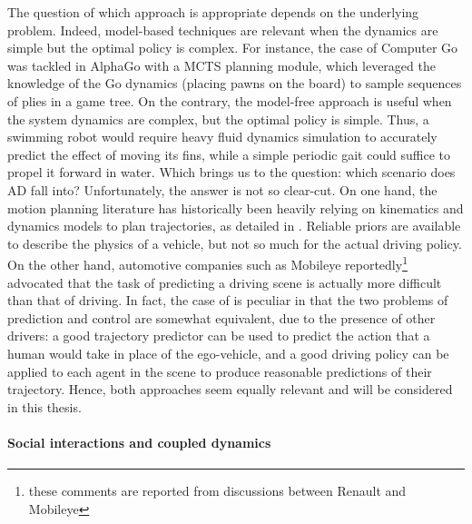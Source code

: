 The question of which approach is appropriate depends on the underlying problem. Indeed, model-based techniques are relevant when the dynamics are simple but the optimal policy is complex. For instance, the case of Computer Go was tackled in AlphaGo \citep{Silver2016,Silver2017,Silver2018} with a \gls{MCTS} planning module, which leveraged the knowledge of the Go dynamics (placing pawns on the board) to sample sequences of plies in a game tree. On the contrary, the model-free approach is useful when the system dynamics are complex, but the optimal policy is simple. Thus, a swimming robot would require heavy fluid dynamics simulation to accurately predict the effect of moving its fins, while a simple periodic gait could suffice to propel it forward in water. Which brings us to the question: which scenario does \gls{AD} fall into? Unfortunately, the answer is not so clear-cut. On one hand, the motion planning literature has historically been heavily relying on kinematics and dynamics models to plan trajectories, as detailed in . Reliable priors are available to describe the physics of a vehicle, but not so much for the actual driving policy. On the other hand, automotive companies such as Mobileye reportedly\footnote{these comments are reported from discussions between Renault and Mobileye} advocated that the task of predicting a driving scene is actually more difficult than that of driving. In fact, the case of  is peculiar in that the two problems of prediction and control are somewhat equivalent, due to the presence of other drivers: a good trajectory predictor can be used to predict the action that a human would take in place of the ego-vehicle, and a good driving policy can be applied to each agent in the scene to produce reasonable predictions of their trajectory. Hence, both approaches seem equally relevant and will be considered in this thesis.

\paragraph{Social interactions and coupled dynamics}


